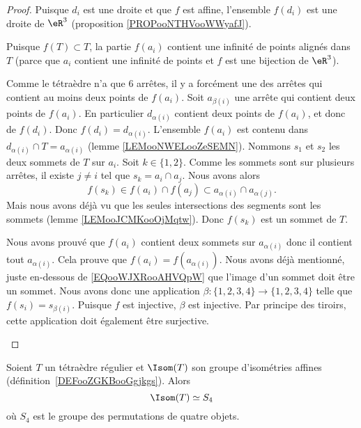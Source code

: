 \begin{proof}
	Puisque \( d_i\) est une droite et que \( f\) est affine, l'ensemble \( f(d_i)\) est une droite de \( \eR^3\) (proposition \ref{PROPooNTHVooWWyafJ}).

	\begin{subproof}
		Puisque \( f(T)\subset T\), la partie \( f(a_i)\) contient une infinité de points alignés dans \( T\) (parce que \( a_i\) contient une infinité de points et \( f\) est une bijection de \( \eR^3\)).

		Comme le tétraèdre n'a que \( 6\) arrêtes, il y a forcément une des arrêtes qui contient au moins deux points de \( f(a_i)\). Soit \( a_{\beta(i)}\) une arrête qui contient deux points de \( f(a_i)\). En particulier \( d_{\alpha(i)}\) contient deux points de \( f(a_i)\), et donc de \( f(d_i)\). Donc \( f(d_i)=d_{\alpha(i)}\).
		L'ensemble \( f(a_i)\) est contenu dans \( d_{\alpha(i)}\cap T=a_{\alpha(i)}\) (lemme \ref{LEMooNWELooZeSEMN}). Nommons \( s_1\) et \( s_2\) les deux sommets de \( T\) sur \( a_i\). Soit \( k\in\{ 1,2 \}\). Comme les sommets sont sur plusieurs arrêtes, il existe \( j\neq i\) tel que \( s_k=a_i\cap a_j\). Nous avons alors
		\begin{equation}        \label{EQooWJXRooAHVQpW}
			f(s_k)\in f(a_i)\cap f(a_j)\subset a_{\alpha(i)}\cap a_{\alpha(j)}.
		\end{equation}
		Mais nous avons déjà vu que les seules intersections des segments sont les sommets (lemme \ref{LEMooJCMKooOjMqtw}). Donc \( f(s_k)\) est un sommet de \( T\).

		Nous avons prouvé que \( f(a_i)\) contient deux sommets sur \( a_{\alpha(i)}\) donc il contient tout \( a_{\alpha(i)}\). Cela prouve que \( f(a_i)=f(a_{\alpha(i)})\).
		Nous avons déjà mentionné, juste en-dessous de \eqref{EQooWJXRooAHVQpW} que l'image d'un sommet doit être un sommet. Nous avons donc une application \( \beta\colon \{ 1,2,3,4 \}\to \{ 1,2,3,4 \}\) telle que \( f(s_i)=s_{\beta(i)}\). Puisque \( f\) est injective, \( \beta\) est injective. Par principe des tiroirs, cette application doit également être surjective.
	\end{subproof}
\end{proof}

\begin{proposition}       \label{PROPooVNLKooOjQzCj}
	Soient \( T\) un tétraèdre régulier et \( \Isom(T)\) son groupe d'isométries affines (définition~\ref{DEFooZGKBooGgjkgs}). Alors
	\begin{equation}
		\Isom(T)\simeq S_4
	\end{equation}
	où \( S_4\) est le groupe des permutations de quatre objets.
\end{proposition}

